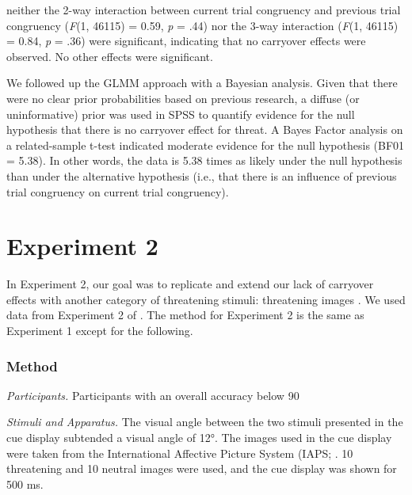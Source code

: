 \documentclass{article}
\begin{document}
neither the 2-way interaction between current trial congruency and previous trial congruency (\emph{F}(1, 46115) = 0.59, \emph{p }= .44) nor the 3-way interaction (\emph{F}(1, 46115) = 0.84, \emph{p }= .36) were significant, indicating that no carryover effects were observed. No other effects were significant.



	We followed up the GLMM approach with a Bayesian analysis{\color{4472C4}. }{\color{4472C4}Given that} {\color{4472C4}there were no clear prior probabilities based on previous research, a diffuse (or uninformative) prior was used} {\color{4472C4}in SPSS }to quantify evidence for the null hypothesis that there is no carryover effect for threat. A Bayes Factor analysis on a related-sample t-test indicated moderate evidence for the null hypothesis (BF01 = 5.38). In other words, the data is 5.38 times as likely under the null hypothesis than under the alternative hypothesis (i.e., that there is an influence of previous trial congruency on current trial congruency).



	\section{Experiment 2}



	In Experiment 2, our goal was to replicate and extend our lack of carryover effects with another category of threatening stimuli: threatening images \textcite{[object Object]}. We used data from Experiment 2 of \textcite{[object Object]}. The method for Experiment 2 is the same as Experiment 1 except for the following.



	\subsubsection{Method}



	\emph{Participants. }Participants with an overall accuracy below 90%



	\emph{Stimuli and Apparatus. }The visual angle between the two stimuli presented in the cue display subtended a visual angle of 12°. The images used in the cue display were taken from the International Affective Picture System (IAPS; \textcite{[object Object]}. 10 threatening and 10 neutral images were used, and the cue display was shown for 500 ms.
\end{document}
